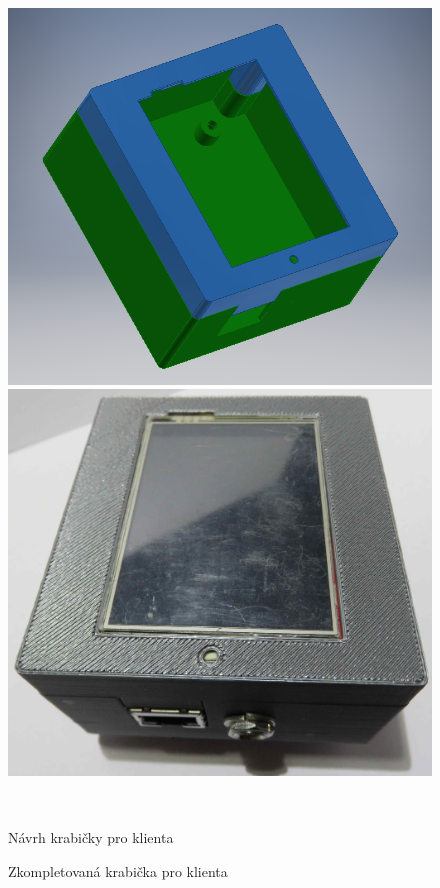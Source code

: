 \begin{figure}[hbtp]
\centering
\begin{minipage}[c]{\textwidth/2-1cm}
\includegraphics[width=\textwidth]{img/foto/client_navrh.png}
\end{minipage}
\begin{minipage}[c]{\textwidth/2-1cm}
\includegraphics[width=\textwidth]{img/foto/client_realizace.jpg}
\end{minipage}
\\
\begin{minipage}[c]{\textwidth/2-0.5cm}
\caption{\label{fig:client_navrh}Návrh krabičky pro klienta\newline}
\end{minipage}
\begin{minipage}[c]{\textwidth/2-.5cm}
\caption{\label{fig:client_realizace}Zkompletovaná krabička pro klienta}
\end{minipage}
\end{figure}

